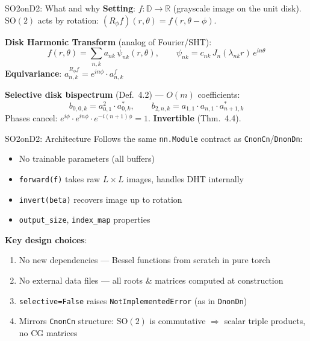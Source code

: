 \documentclass[aspectratio=169]{beamer}
\begin{document}
\begin{frame}{SO2onD2: What and why}
  \textbf{Setting}: $f : \mathbb{D} \to \mathbb{R}$ (grayscale image on the unit disk).
  $\mathrm{SO}(2)$ acts by rotation: $(R_\phi f)(r,\theta) = f(r, \theta - \phi)$.

  \medskip

  \textbf{Disk Harmonic Transform} (analog of Fourier/SHT):
  \[
    f(r, \theta) = \textstyle\sum_{n,k} a_{nk} \, \psi_{nk}(r, \theta), \qquad
    \psi_{nk} = c_{nk} \, J_n(\lambda_{nk} r) \, e^{in\theta}
  \]
  \textbf{Equivariance}: $a^{R_\phi f}_{n,k} = e^{in\phi} \cdot a^f_{n,k}$

  \medskip

  \textbf{Selective disk bispectrum} (Def.~4.2) --- $O(m)$ coefficients:
  \[
    b_{0,0,k} = a_{0,1}^2 \cdot a_{0,k}^*, \qquad
    b_{2,n,k} = a_{1,1} \cdot a_{n,1} \cdot a_{n+1,k}^*
  \]
  Phases cancel: $e^{i\phi} \cdot e^{in\phi} \cdot e^{-i(n+1)\phi} = 1$. \textbf{Invertible} (Thm.~4.4).
\end{frame}

\begin{frame}{SO2onD2: Architecture}
  Follows the same \texttt{nn.Module} contract as \texttt{CnonCn}/\texttt{DnonDn}:
  \begin{itemize}
    \item No trainable parameters (all buffers)
    \item \texttt{forward(f)} takes raw $L \times L$ images, handles DHT internally
    \item \texttt{invert(beta)} recovers image up to rotation
    \item \texttt{output\_size}, \texttt{index\_map} properties
  \end{itemize}

  \bigskip

  \textbf{Key design choices}:
  \begin{enumerate}
    \item No new dependencies --- Bessel functions from scratch in pure torch
    \item No external data files --- all roots \& matrices computed at construction
    \item \texttt{selective=False} raises \texttt{NotImplementedError} (as in \texttt{DnonDn})
    \item Mirrors \texttt{CnonCn} structure: $\mathrm{SO}(2)$ is commutative $\Rightarrow$ scalar triple products, no CG matrices
  \end{enumerate}
\end{frame}
\end{document}
